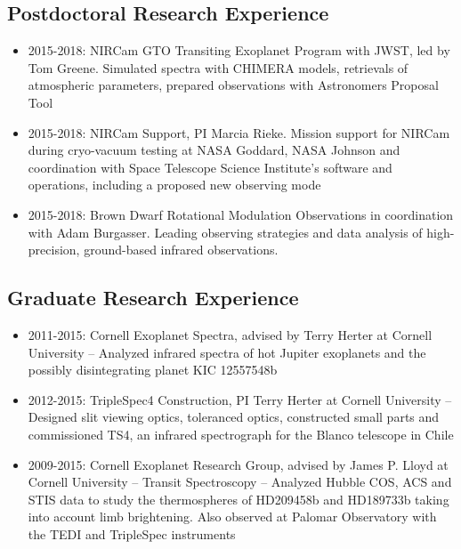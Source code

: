 \documentclass[11pt, oneside]{article}   	%
\begin{document}
\subsection*{Postdoctoral Research Experience}
\begin{itemize}[noitemsep]
	\item 2015-2018: NIRCam GTO Transiting Exoplanet Program with JWST, led by Tom Greene. Simulated spectra with CHIMERA models, retrievals of atmospheric parameters, prepared observations with Astronomers Proposal Tool
	\item 2015-2018: NIRCam Support, PI Marcia Rieke. Mission support for NIRCam during cryo-vacuum testing at NASA Goddard, NASA Johnson and coordination with Space Telescope Science Institute's software and operations, including a proposed new observing mode
	\item 2015-2018: Brown Dwarf Rotational Modulation Observations in coordination with Adam Burgasser. Leading observing strategies and data analysis of high-precision, ground-based infrared observations.
\end{itemize}

\subsection*{Graduate Research Experience}
\begin{itemize}[noitemsep]
	\item 2011-2015: Cornell Exoplanet Spectra, advised by Terry Herter at Cornell University -- Analyzed infrared spectra of hot Jupiter exoplanets and the possibly disintegrating planet KIC 12557548b
	\item 2012-2015: TripleSpec4 Construction, PI Terry Herter at Cornell University -- Designed slit viewing optics, toleranced optics, constructed small parts and commissioned TS4, an infrared spectrograph for the Blanco telescope in Chile
	\item 2009-2015: Cornell Exoplanet Research Group, advised by James P. Lloyd at Cornell University -- Transit Spectroscopy -- Analyzed Hubble COS, ACS and STIS data to study the thermospheres of HD209458b and HD189733b taking into account limb brightening. Also observed at Palomar Observatory with the TEDI and TripleSpec instruments
\end{itemize}
\end{document}
